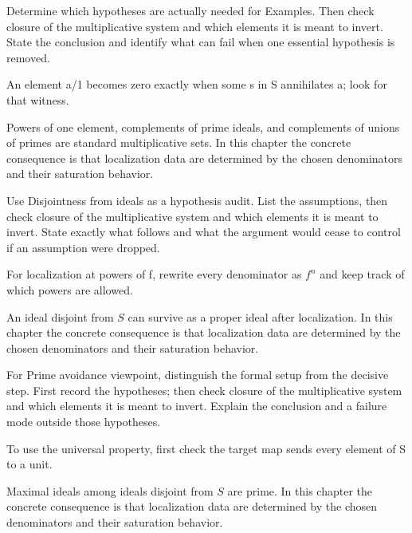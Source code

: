 \begin{exercise}\label{exr:v05-03}
Determine which hypotheses are actually needed for Examples. Then check closure of the multiplicative system and which elements it is meant to invert. State the conclusion and identify what can fail when one essential hypothesis is removed.
\end{exercise}
\begin{hint}
An element a/1 becomes zero exactly when some s in S annihilates a; look for that witness.
\end{hint}
\begin{solution}
Powers of one element, complements of prime ideals, and complements of unions of primes are standard multiplicative sets. In this chapter the concrete consequence is that localization data are determined by the chosen denominators and their saturation behavior.
\end{solution}

\begin{exercise}\label{exr:v05-04}
Use Disjointness from ideals as a hypothesis audit. List the assumptions, then check closure of the multiplicative system and which elements it is meant to invert. State exactly what follows and what the argument would cease to control if an assumption were dropped.
\end{exercise}
\begin{hint}
For localization at powers of f, rewrite every denominator as \(f^n\) and keep track of which powers are allowed.
\end{hint}
\begin{solution}
An ideal disjoint from $S$ can survive as a proper ideal after localization. In this chapter the concrete consequence is that localization data are determined by the chosen denominators and their saturation behavior.
\end{solution}

\begin{exercise}\label{exr:v05-05}
For Prime avoidance viewpoint, distinguish the formal setup from the decisive step. First record the hypotheses; then check closure of the multiplicative system and which elements it is meant to invert. Explain the conclusion and a failure mode outside those hypotheses.
\end{exercise}
\begin{hint}
To use the universal property, first check the target map sends every element of S to a unit.
\end{hint}
\begin{solution}
Maximal ideals among ideals disjoint from $S$ are prime. In this chapter the concrete consequence is that localization data are determined by the chosen denominators and their saturation behavior.
\end{solution}

